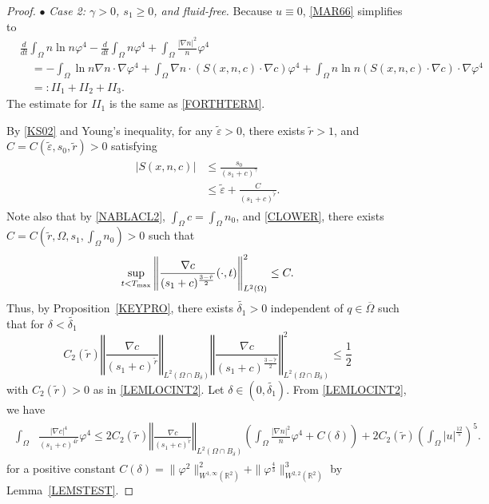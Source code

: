 \documentclass{amsart}
\numberwithin{equation}{section}
\newcommand{\R}{{ \mathbb{R}  }}
\newcommand{\bke}[1]{\left( #1 \right)}
\newcommand{\norm}[1]{\left\Vert #1 \right\Vert}
\begin{document}
\begin{proof}

\smallskip
$\bullet$ \emph{Case 2: $\gamma>0$, $s_{1}\ge 0$, and fluid-free.} 
Because $u \equiv 0$, \eqref{MAR66} simplifies to 
\begin{equation}\label{MAR66_FF}
\begin{aligned}
 &\frac{d}{dt}\int_{\Omega}  n\ln n \varphi^{4}- \frac{d}{dt}\int_{\Omega}n\varphi^{4} 
 + \int_{\Omega} \frac{|\nabla n|^{2}}{n}\varphi^{4} \\
&\quad  =  -\int_{\Omega} \ln n\nabla n\cdot \nabla \varphi^{4} 
  + \int_{\Omega}\nabla n  \cdot ( S(x,n,c)\cdot\nabla c) \varphi^{4}
  + \int_{\Omega}n\ln n (S(x,n,c)\cdot\nabla c  ) \cdot\nabla \varphi^4 \\
&\quad =: II_1 + II_2 + II_3.
\end{aligned}
\end{equation}
The estimate for $II_1$ is the same as \eqref{FORTHTERM}. 

By \eqref{KS02} and Young's inequality, for any $\tilde{\varepsilon}>0$, there exists  $\tilde{r}>1$, and $C=C(\tilde{\varepsilon}, s_{0},\tilde{r})>0$ satisfying 
\begin{align}\label{SSPLIT2}
\begin{aligned}
|S(x,n,c)|&\le \frac{s_{0}}{(s_{1}+c)^{\gamma}}
\\&\le  \tilde{\varepsilon}+\frac{C}{(s_{1}+c)^{\tilde{r}}}.
\end{aligned}
\end{align}
Note also that 
 by \eqref{NABLACL2},
$\int_{\Omega}c=\int_{\Omega}n_{0}$, and \eqref{CLOWER}, there exists  $C=C(\tilde{r}, \Omega, s_1, \int_{\Omega}n_0)>0$   such that
\begin{equation}\label{FEB10_FF}
\sup_{t<T_{\rm max}} \norm{\frac{\nabla c}{(s_{1}+c)^{\frac{3-\tilde{r}}{2}}}(\cdot,t)}_{L^{2}(\Omega)}^{2} \le C.
\end{equation}
Thus, by Proposition~\ref{KEYPRO}, there exists $\tilde{\delta_{1}}>0$ independent of $q\in\overline{\Omega}$ such that for $\delta<\tilde{\delta_{1}}$
\[
C_{2}(\tilde{r})\norm{\frac{\nabla c}{(s_{1}+c)^{\tilde{r}}}}_{L^{2}(\Omega\cap B_{\delta})} \norm{\frac{\nabla c}{(s_{1}+c)^{\frac{3-\tilde{r}}{2}}}}_{L^{2}(\Omega\cap B_{\delta})}^{2}  \le \frac{1}{2}
\]
with $C_2 (\tilde{r}) >0$ as in \eqref{LEMLOCINT2}.
Let $\delta\in (0, \tilde{\delta_{1}})$. From \eqref{LEMLOCINT2}, we have
\begin{align}\label{LEMLOCINT13}
\begin{aligned} 
 \int_{\Omega} &\frac{|\nabla c|^{4}}{(s_{1}+c)^{4\tilde{r}}}\varphi^{4}
   \le
   2C_{2}(\tilde{r})\norm{\frac{\nabla c}{(s_{1}+c)^{\tilde{r}}}}_{L^{2}(\Omega\cap B_{\delta})}
\bke{   \int_{\Omega} \frac{|\nabla n|^{2}}{n}\varphi^{4}   +C(\delta)}
+2C_{2}(\tilde{r})\bke{\int_{\Omega}|u|^{\frac{12}{5}} }^{5}.
\end{aligned}
\end{align}
for a positive constant $C(\delta)=\| \varphi^{2}  \|_{W^{1,\infty}(\R^{2})}^{2}  +\|\varphi^{\frac{4}{3}}\|_{W^{2,2}(\R^{2})}^{3}$ by Lemma~\ref{LEMSTEST}. 


\end{proof}
\end{document}
